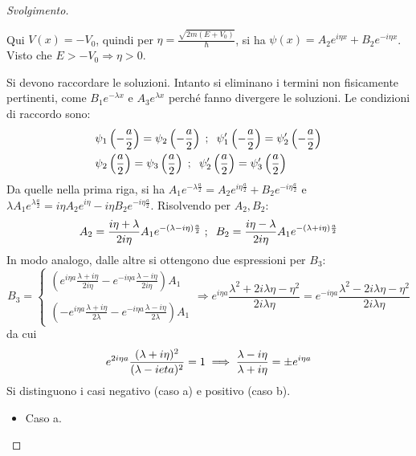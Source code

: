 \documentclass[10pt, a4paper]{scrartcl} %
\numberwithin{equation}{subsection}
\theoremstyle{style2}
\theoremstyle{style1}
\renewcommand\qedsymbol{$\blacksquare$}
\newenvironment{svolgimento}{\renewcommand\qedsymbol{$\spadesuit$}\begin{proof}[Svolgimento]}{\end{proof}}
\begin{document}
\begin{svolgimento}
\begin{itemize}
		Qui $V(x) = - V_0$, quindi per $\eta = \frac{\sqrt{2m (E+V_0)} }{\hbar }$, si ha $\psi (x) = A_2e^{i\eta x}  + B_2 e^{-i\eta x} $. Visto che $E>-V_0\Rightarrow \eta>0$.
\end{itemize}
Si devono raccordare le soluzioni. Intanto si eliminano i termini non fisicamente pertinenti, come $B_1 e^{- \lambda x} $ e $A_3 e^{\lambda  x} $ perch\'e fanno divergere le soluzioni. Le condizioni di raccordo sono:
\[
\begin{split}
	&\psi _1\left(-\frac{a}{2}\right) = \psi _2 \left(-\frac{a}{2}\right) \hspace{.1cm}; \hspace{.2cm}\psi _1'\left(-\frac{a}{2}\right) = \psi _2 '\left(-\frac{a}{2}\right) \\
	&\psi _2\left(\frac{a}{2}\right) = \psi _3 \left(\frac{a}{2}\right) \hspace{.1cm}; \hspace{.2cm}\psi _2'\left(\frac{a}{2}\right) = \psi _3 '\left(\frac{a}{2}\right) 
\end{split}
\] 
Da quelle nella prima riga, si ha $A_1 e^{- \lambda  \frac{a}{2}} = A_2 e^{i\eta \frac{a}{2}} + B_2 e^{-i\eta \frac{a}{2}} $ e $\lambda  A_1 e^{ \lambda  \frac{a}{2}} = i\eta A_2 e^{i\eta }  - i\eta B_2 e^{-i\eta \frac{a}{2}} $. Risolvendo per $A_2,B_2$:
\[
	A_2 = \frac{i\eta +\lambda }{2 i\eta }A_1 e^{- (\lambda -i\eta) \frac{a}{2}} \hspace{.1cm} ; \hspace{.2cm} B_2 = \frac{i\eta -\lambda }{2 i\eta }A_1 e^{- (\lambda +i\eta) \frac{a}{2}} 
\] 
In modo analogo, dalle altre si ottengono due espressioni per $B_3$:
\[
B_3 = \begin{cases}
	\displaystyle \left(e^{i\eta a }\frac{\lambda + i\eta}{2 i \eta} - e^{-i\eta a } \frac{\lambda  - i\eta}{2i\eta}\right) A_1 \\
	\\
	\displaystyle \left(-e^{i\eta a } \frac{\lambda + i\eta}{2 \lambda }- e^{-i\eta a } \frac{\lambda  - i\eta}{2\lambda }\right) A_1 
\end{cases} \Rightarrow e^{i\eta a} \frac{\lambda ^2 + 2i\lambda \eta - \eta^2}{2 i \lambda \eta} = e^{-i\eta a} \frac{\lambda ^2 - 2i\lambda \eta - \eta^2}{2i\lambda \eta}
\] 
da cui
\begin{equation}
	e^{2i \eta a} \frac{(\lambda +i\eta)^2}{(\lambda -i\\eta)^2} = 1 \implies \frac{\lambda - i\eta}{\lambda  + i\eta} = \pm e^{i \eta a} 
\end{equation}
Si distinguono i casi negativo (caso a) e positivo (caso b).
\begin{itemize}
	\item Caso a.


\end{itemize}
\end{svolgimento}
\end{document}
